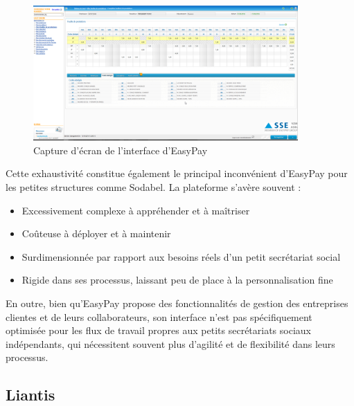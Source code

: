 \begin{figure}[H]
    \centering
    \includegraphics[width=0.9\textwidth]{easyPayScreenshot.png}
    \caption{Capture d'écran de l'interface d'EasyPay \cite{easypay}}
    \label{fig:easyPayScreenshot}
\end{figure}

\begin{tcolorbox}[
  title={\textbf{Limites d'EasyPay pour les petites structures}},
  colback=blue!5!white,
  colframe=primarycolor,
  fonttitle=\bfseries,
  boxrule=0.5mm,
  arc=2mm,
  left=6mm,
  right=6mm,
  top=6mm,
  bottom=6mm
]
\noindent Cette exhaustivité constitue également le principal inconvénient d'EasyPay pour les petites structures comme Sodabel. La plateforme s'avère souvent :
\begin{itemize}[leftmargin=*,label=\textcolor{darkgray}{$\bullet$},itemsep=0.3em]
  \item Excessivement complexe à appréhender et à maîtriser
  \item Coûteuse à déployer et à maintenir
  \item Surdimensionnée par rapport aux besoins réels d'un petit secrétariat social
  \item Rigide dans ses processus, laissant peu de place à la personnalisation fine
\end{itemize}
\end{tcolorbox}

\vspace{0.5cm}

\noindent En outre, bien qu'EasyPay propose des fonctionnalités de gestion des entreprises clientes et de leurs collaborateurs, son interface n'est pas spécifiquement optimisée pour les flux de travail propres aux petits secrétariats sociaux indépendants, qui nécessitent souvent plus d'agilité et de flexibilité dans leurs processus.

\subsection{Liantis}

